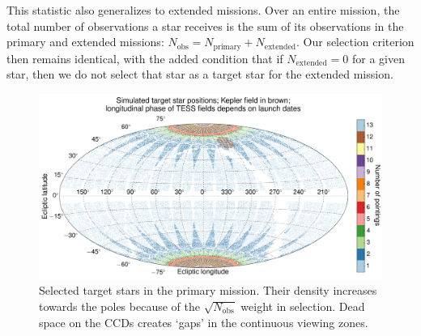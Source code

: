 This statistic also generalizes to extended missions.
Over an entire mission, the total number of observations a star receives is the sum of its observations in the primary and extended missions: $N_\text{obs}=N_\text{primary}+N_\text{extended}$.
Our selection criterion then remains identical, with the added condition that if $N_\text{extended}=0$ for a given star, then we do not select that star as a target star for the extended mission.
\begin{figure}[!t] %
	\centering
	\includegraphics{figures/positions_pointings_kepler.pdf}
	\caption{Selected target stars in the primary mission. Their density increases towards the poles because of the $\sqrt{N_\text{obs}}$ weight in selection. Dead space on the CCDs creates `gaps' in the continuous viewing zones.}
	\label{fig:positions_pointings}
\end{figure}
